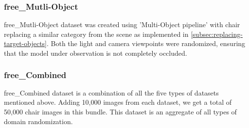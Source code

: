 \subsubsection{\gls{free}\_Mutli-Object}

\gls{free}\_Mutli-Object dataset was created using 'Multi-Object pipeline' with chair replacing a similar category from the scene as implemented in \autoref{subsec:replacing-target-objects}.
Both the light and camera viewpoints were randomized, ensuring that the model under observation is not completely occluded.

\subsubsection{\gls{free}\_Combined}
\gls{free}\_Combined dataset is a combination of all the five types of datasets mentioned above.
Adding 10,000 images from each dataset, we get a total of 50,000 chair images in this bundle.
This dataset is an aggregate of all types of domain randomization.





